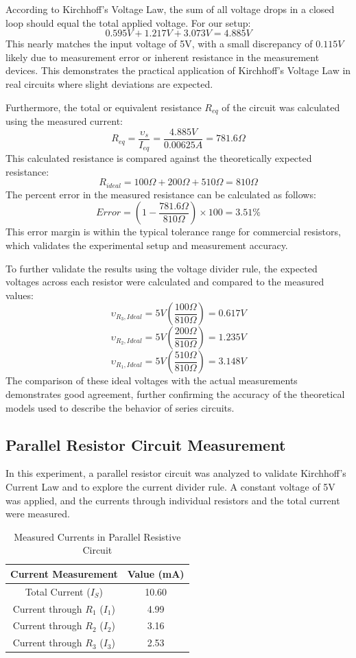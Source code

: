 \documentclass[12pt]{article}
\begin{document}
According to Kirchhoff's Voltage Law, the sum of all voltage drops in a closed loop should equal the total applied voltage. For our setup:
\[
	0.595V + 1.217V + 3.073V = 4.885V
\]
This nearly matches the input voltage of 5V, with a small discrepancy of \(0.115V\) likely due to measurement error or inherent resistance in the measurement devices. This demonstrates the practical application of Kirchhoff's Voltage Law in real circuits where slight deviations are expected.

Furthermore, the total or equivalent resistance \( R_{eq} \) of the circuit was calculated using the measured current:
\[
	R_{eq} = \frac{\upsilon_{s}}{I_{eq}} = \frac{4.885V}{0.00625A} = 781.6\Omega
\]
This calculated resistance is compared against the theoretically expected resistance:
\[
	R_{ideal} = 100\Omega + 200\Omega + 510\Omega = 810\Omega
\]
The percent error in the measured resistance can be calculated as follows:
\[
	Error = \left(1 - \frac{781.6\Omega}{810\Omega}\right) \times 100 = 3.51\%
\]
This error margin is within the typical tolerance range for commercial resistors, which validates the experimental setup and measurement accuracy.

To further validate the results using the voltage divider rule, the expected voltages across each resistor were calculated and compared to the measured values:
\[
	\upsilon_{R_3, Ideal} = 5V \left(\frac{100\Omega}{810\Omega}\right) = 0.617V
\]
\[
	\upsilon_{R_2, Ideal} = 5V \left(\frac{200\Omega}{810\Omega}\right) = 1.235V
\]
\[
	\upsilon_{R_1, Ideal} = 5V \left(\frac{510\Omega}{810\Omega}\right) = 3.148V
\]
The comparison of these ideal voltages with the actual measurements demonstrates good agreement, further confirming the accuracy of the theoretical models used to describe the behavior of series circuits.

\subsection{Parallel Resistor Circuit Measurement}
In this experiment, a parallel resistor circuit was analyzed to validate Kirchhoff's Current Law and to explore the current divider rule. A constant voltage of 5V was applied, and the currents through individual resistors and the total current were measured.

\begin{table}[H]
	\centering
	\begin{tabular}{|c|c|}
		\hline
		\textbf{Current Measurement}      & \textbf{Value (mA)} \\
		\hline
		Total Current (\(I_S\))           & 10.60               \\
		Current through \(R_1\) (\(I_1\)) & 4.99                \\
		Current through \(R_2\) (\(I_2\)) & 3.16                \\
		Current through \(R_3\) (\(I_3\)) & 2.53                \\
		\hline
	\end{tabular}
	\caption{Measured Currents in Parallel Resistive Circuit}
	\label{tab:parallel_data}
\end{table}
\end{document}
